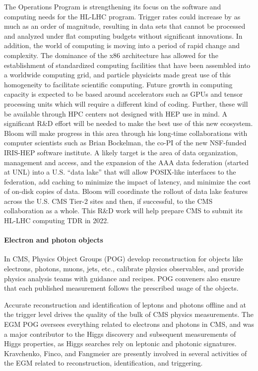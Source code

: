 The Operations Program is strengthening its focus on the software and computing needs for the HL-LHC program.  Trigger rates could increase by as much as an order of magnitude, resulting in data sets that cannot be processed and analyzed under flat computing budgets without significant innovations.  In addition, the world of computing is moving into a period of rapid change and complexity.  The dominance of the x86 architecture has allowed for the establishment of standardized computing facilities that have been assembled into a worldwide computing grid, and particle physicists made great use of this homogeneity to facilitate scientific computing.  Future growth in computing capacity is expected to be based around accelerators such as GPUs and tensor processing units which will require a different kind of coding.  Further, these will be available through HPC centers  not designed with HEP use in mind.  A significant R\&D effort will be needed to make the best use of this new ecosystem.  Bloom will make progress in this area through his long-time collaborations with computer scientists such as Brian Bockelman, the co-PI of the new NSF-funded IRIS-HEP software institute.  A likely target is the area of data organization, management and access, and the expansion of the AAA data federation (started at UNL) into a U.S. ``data lake'' that will allow POSIX-like interfaces to the federation, add caching to minimize the impact of latency, and minimize the cost of on-disk copies of data.  Bloom will coordinate the rollout of data lake features across the U.S. CMS Tier-2 sites and then, if successful, to the CMS collaboration as a whole.  This R\&D work will help prepare CMS to submit its HL-LHC computing TDR in 2022.

\paragraph{Electron and photon objects}
In CMS, Physics Object Groups (POG) develop reconstruction for objects like electrons, photons, muons, jets, etc.,
%
calibrate physics observables, and provide  physics analysis teams  with guidance and recipes. POG conveners also ensure that each published measurement follows the prescribed usage of the objects. 

Accurate reconstruction and identification of leptons and photons offline and at the trigger level drives the quality of the bulk of CMS physics measurements. 
The EGM POG oversees everything related to electrons and photons in CMS, and was a major contributor to the Higgs discovery and subsequent measurements of Higgs properties, as Higgs searches rely on leptonic and photonic signatures. Kravchenko, Finco, and Fangmeier are presently involved in several activities of the EGM related to reconstruction, identification, and triggering.

